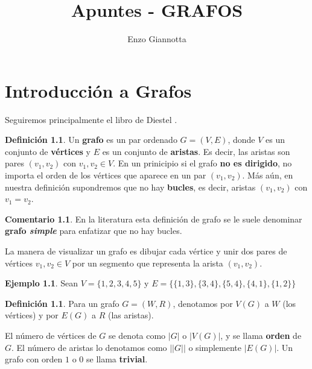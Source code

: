 \documentclass[12pt]{report}
\title{Apuntes - GRAFOS}
\author{Enzo Giannotta}
\theoremstyle{plain}
\theoremstyle{definition}
\newtheorem{definition}[theorem]{Definición}
\newtheorem{example}[theorem]{Ejemplo}
\newtheorem{remark}[theorem]{Comentario}
\newenvironment{Definition}{\colorlet{shadecolor}{Apricot!12} \begin{shaded} \begin{definition} }{ \end{definition} \end{shaded} }
\newcommand{\abs}[1]{\left \vert #1 \right \vert}
\newcommand{\Abs}[1]{\left \vert \left \vert #1 \right \vert \right \vert}
\begin{document}
\maketitle


\tableofcontents


\chapter{Introducción a Grafos}


Seguiremos principalmente el libro de Diestel \cite{diestelGraphTheory}.


\begin{Definition}
Un \textbf{grafo} es un par ordenado $G = (V,E)$, donde $V$ es un conjunto de \textbf{vértices} y $E$ es un conjunto de \textbf{aristas}. Es decir, las aristas son pares $(v_1,v_2)$ con $v_1,v_2 \in V$. En un prinicipio si el grafo \textbf{no es dirigido}, no importa el orden de los vértices que aparece en un par $(v_1,v_2)$. Más aún, en nuestra definición supondremos que no hay \textbf{bucles}, es decir, aristas $(v_1,v_2)$ con $v_1 = v_2$.
\end{Definition}
\begin{remark}
En la literatura esta definición de grafo se le suele denominar \textbf{grafo \textit{simple}} para enfatizar que no hay bucles.
\end{remark}

La manera de visualizar un grafo es dibujar cada vértice y unir dos pares de vértices $v_1,v_2 \in V$ por un segmento que representa la arista $(v_1,v_2)$.

\begin{example}
Sean $V = \{ 1,2,3,4,5\}$ y $E = \{ \{1,3\} , \{3,4\} , \{ 5,4\} , \{4,1 \} , \{ 1,2\}\}$



\end{example}


\begin{definition}
Para un grafo $G = (W,R)$, denotamos por $V(G)$ a $W$ (los vértices) y por $E(G)$ a $R$ (las aristas).

El número de vértices de $G$ se denota como $\abs G$ o $\abs{V(G)}$, y se llama \textbf{orden} de $G$. El número de aristas lo denotamos como $\Abs G$ o simplemente $\abs{E(G)}$. Un grafo con orden $1$ o $0$ se llama \textbf{trivial}.
\end{definition}
\end{document}
